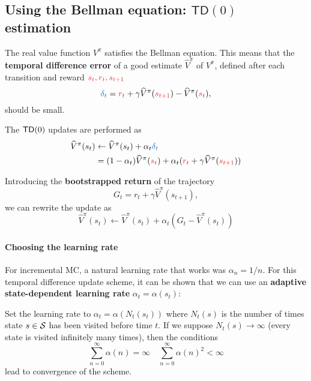 \documentclass[../course-notes.tex]{subfiles}
\begin{document}
\subsection{Using the Bellman equation: $\mathsf{TD}(0)$ estimation}

The real value function $V^\pi$ satisfies the Bellman equation. This means that the \textbf{\bluefont temporal difference error} of a good estimate $\widehat{V}^\pi$ of $V^\pi$, defined after each transition and reward ${\redfont s_t,r_t,s_{t+1}}$
\begin{equation}\label{eq:ValueTDerror}
	{\bluefont\delta_t} = {\redfont r_t} + \gamma \widehat{V}^\pi({\redfont s_{t+1}}) - \widehat{V}^\pi({\redfont s_t}),
\end{equation}
should be small.

The $\mathsf{TD}(0)$ updates are performed as
\begin{align*}
	\widehat{V}^\pi(s_t) &\leftarrow
	\widehat{V}^\pi(s_t) + \alpha_t {\bluefont \delta_t} \\
	&= (1 - \alpha_t)\widehat{V}^\pi({\redfont s_t}) + \alpha_t ({\redfont r_t} + \gamma \widehat{V}^\pi({\redfont s_{t+1}}))
\end{align*}

\begin{remark}
	Introducing the \textbf{bootstrapped return} of the trajectory
	\[
		G_t = r_t + \gamma\widehat{V}^\pi(s_{t+1}),
	\]
	we can rewrite the update as
	\[
		\widehat{V}^\pi(s_t) \leftarrow \widehat{V}^\pi(s_t) + \alpha_t (G_t - \widehat{V}^\pi(s_t))
	\]
\end{remark}


\paragraph{Choosing the learning rate} For incremental MC, a natural learning rate that works was $\alpha_n = 1/n$. For this temporal difference update scheme, it can be shown that we can use an \textbf{adaptive state-dependent learning rate} $\alpha_t = \alpha(s_t)$:
\begin{prop}\label{prop:ValueTD0learningRate}
	Set the learning rate to $\alpha_t = \alpha(N_t(s_t))$ where $N_t(s)$ is the number of times state $s\in\mathcal{S}$ has been visited before time $t$. If we suppose $N_t(s) \to \infty$ (every state is visited infinitely many times), then the conditions
	\begin{equation}
	\sum_{n=0}^{\infty} \alpha(n) = \infty \quad
	\sum_{n=0}^{\infty} \alpha(n)^2 < \infty
	\end{equation}
	lead to convergence of the scheme.
\end{prop}
\end{document}
